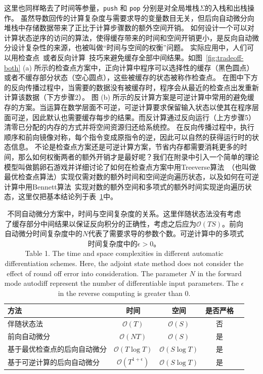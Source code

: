 \documentclass[A4,twoside,UTF8]{ctexart}
\newcommand{\bigO}{{\mathcal{O}}}
\begin{document}
这里也同样略去了时间等参量，\texttt{push} 和 \texttt{pop} 分别是对全局堆栈$\Sigma$的入栈和出栈操作。
虽然导数回传的计算复杂度与需要求导的变量数目无关，但后向自动微分向堆栈中存储数据带来了正比于计算步骤数的额外空间开销。
如何设计一个可以对计算状态逆序的访问的算法，使得缓存带来的时间和空间开销更小，是反向自动微分设计复杂性的来源，也被叫做“时间与空间的权衡”问题。
实际应用中，人们可以用检查点~\cite{Griewank1992}或者反向计算~\cite{Liu2020b}技巧来避免缓存全部中间结果。如图~\ref{fig:tradeoff-both} (a) 所示的检查点方案中，正向计算中程序可以选择性的缓存（黑色圆点）或者不缓存部分状态（空心圆点），这些被缓存的状态被称作检查点。
在图中下方的反向传播过程中，当需要的数据没有被缓存时，程序会从最近的检查点出发重新计算该数据（下方步骤2）。
图 (b) 所示的反计算方案是可逆计算中常用的避免缓存的方案。当运算在数学层面不可逆，可逆计算要求保留输入状态以使其在程序层面可逆，因此默认也需要缓存每步的结果。而反计算通过反向运行（上方步骤5）清零已分配的内存的方式并将空间资源归还给系统控。
在反向传播过程中，执行顺序和前向镜像对称，每个指令变成原指令的逆，因此可以自然的获得运行时的状态信息。
不论是检查点方案还是可逆计算方案，节省内存都需要消耗更多的时间，那么如何权衡两者的额外开销才是最好呢？我们在附录中引入一个简单的理论模型叫做鹅卵石游戏并详细讨论了如何在检查点方案中用Treeverse算法~\cite{Griewank1992}（也叫做最优检查点算法）实现仅需对数的额外时间和空间逆向遍历状态，以及如何在可逆计算中用Bennett算法~\cite{Levine1990}实现对数的额外空间和多项式的额外时间实现逆向遍历状态，这里仅把基本结论列于表~\ref{tbl:complexity}中。

\begin{table}\centering
    \begin{tabularx}{0.8\textwidth}{Xcccc}\toprule
        \textbf{方法} & 时间 & 空间 & 是否严格 \\
        \hline
        伴随状态法                    &  $\bigO(T)$          & $\bigO(S)$ & 否 \\
        前向自动微分                 &  $\bigO(NT)$         & $\bigO(S)$ & 是 \\
        基于最优检查点的后向自动微分     &  $\bigO(T\log T)$    & $\bigO(S\log T)$  & 是\\
        基于可逆计算的后向自动微分   &  $\bigO(T^{1+\epsilon})$ & $\bigO(S\log T)$  & 是 \\
        \bottomrule
    \end{tabularx}
    \caption{不同自动微分方案中，时间与空间复杂度的关系。这里伴随状态法没有考虑了缓存部分中间结果以保证反向积分的正确性，考虑之后应为$\bigO(TS)$。前向自动微分时间复杂度中的$N$代表了需要求导的参数个数。可逆计算中的多项式时间复杂度中的$\epsilon > 0$。\\
    Table 1. The time and space complexities in different automatic differentiation schemes.
    Here, the adjoint state method does not consider the effect of round off error into consideration.
    The parameter $N$ in the forward mode autodiff represent the number of differentiable input parameters. The $\epsilon$ in the reverse computing is greater than $0$.
    } \label{tbl:complexity}
\end{table}
\end{document}
